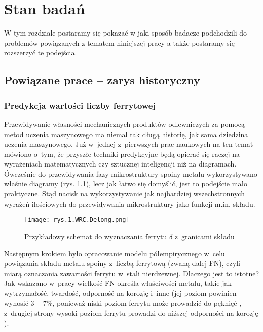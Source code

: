 
\chapter{Stan badań}
\label{cha:stan.badan}

W tym rozdziale postaramy się pokazać w jaki sposób badacze podchodzili do problemów powiązanych z tematem niniejszej pracy a także postaramy się rozszerzyć te podejścia.

\section{Powiązane prace – zarys historyczny}
\label{sec:zarys.historyczny}

\subsection{Predykcja wartości liczby ferrytowej}
\label{sec:liczba.ferrytowa}

Przewidywanie własności mechanicznych produktów odlewniczych za pomocą metod uczenia maszynowego ma niemal tak długą historię, jak sama dziedzina uczenia maszynowego. Już w~jednej z~pierwszych prac naukowych na ten temat \cite{Olson85} mówiono o~tym, że przyszłe techniki predykcyjne będą opierać się raczej na wyrażeniach matematycznych czy sztucznej inteligencji niż na diagramach. 
Ówcześnie do przewidywania fazy mikrostruktury spoiny metalu wykorzystywano właśnie diagramy (rys. \ref{fig:mesh1}), lecz jak łatwo się domyślić, jest to podejście mało praktyczne. Stąd nacisk na wykorzystywanie jak najbardziej wszechstronnych wyrażeń ilościowych do przewidywania mikrostruktury jako funkcji m.in. składu.

\begin{figure}[h]
    \centering
    \texttt{[image: rys.1.WRC.Delong.png]}
    \caption{Przykładowy schemat do wyznaczania ferrytu $ \delta $ z~granicami składu \cite{DeLong73}}
    \label{fig:mesh1}
\end{figure}

Następnym krokiem było opracowanie modelu półempirycznego w~celu powiązania składu metalu spoiny z~liczbą ferrytową (zwaną dalej FN), czyli miarą oznaczania zawartości ferrytu w~stali nierdzewnej. Dlaczego jest to istotne? Jak wskazano w~pracy \cite{Vitek03.I} wielkość FN określa właściwości metalu, takie jak wytrzymałość, twardość, odporność na korozję i~inne (jej poziom powinien wynosić $3-7\%$, ponieważ niski poziom ferrytu może prowadzić do pęknięć \cite{ferrite.meter, Saluja15}, z~drugiej strony wysoki poziom ferrytu prowadzi do niższej odporności na korozję \cite{Saluja15}). 


